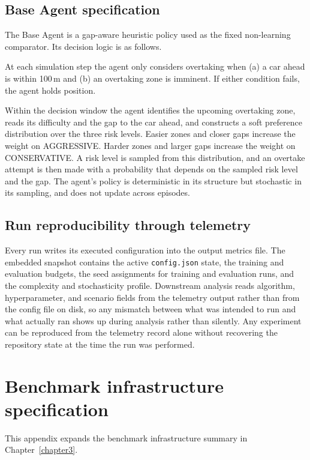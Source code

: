 \begin{appendices}
\section{Base Agent specification}

The Base Agent is a gap-aware heuristic policy used as the fixed non-learning comparator. Its decision logic is as follows.

At each simulation step the agent only considers overtaking when (a) a car ahead is within 100\,m and (b) an overtaking zone is imminent. If either condition fails, the agent holds position.

Within the decision window the agent identifies the upcoming overtaking zone, reads its difficulty and the gap to the car ahead, and constructs a soft preference distribution over the three risk levels. Easier zones and closer gaps increase the weight on \textsc{AGGRESSIVE}. Harder zones and larger gaps increase the weight on \textsc{CONSERVATIVE}. A risk level is sampled from this distribution, and an overtake attempt is then made with a probability that depends on the sampled risk level and the gap. The agent's policy is deterministic in its structure but stochastic in its sampling, and does not update across episodes.

\section{Run reproducibility through telemetry}

Every run writes its executed configuration into the output metrics file. The embedded snapshot contains the active \texttt{config.json} state, the training and evaluation budgets, the seed assignments for training and evaluation runs, and the complexity and stochasticity profile. Downstream analysis reads algorithm, hyperparameter, and scenario fields from the telemetry output rather than from the config file on disk, so any mismatch between what was intended to run and what actually ran shows up during analysis rather than silently. Any experiment can be reproduced from the telemetry record alone without recovering the repository state at the time the run was performed.

\chapter{Benchmark infrastructure specification}
\label{appendix:benchmark-infra}

This appendix expands the benchmark infrastructure summary in Chapter~\ref{chapter3}.


\end{appendices}
